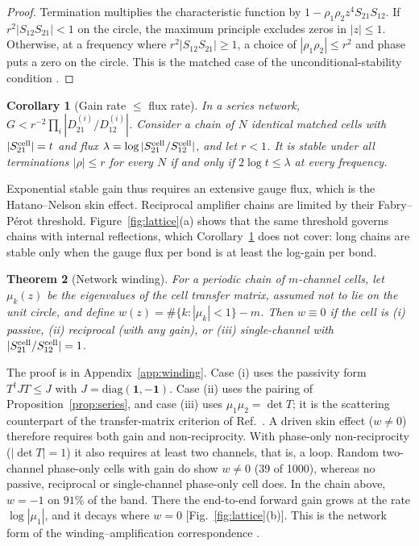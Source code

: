 \documentclass[aps,pra,twocolumn,superscriptaddress,floatfix,nofootinbib]{revtex4-2}
\newtheorem{theorem}{Theorem}
\newtheorem{corollary}[theorem]{Corollary}
\theoremstyle{definition}
\newcommand{\one}{\mathbf 1}
\begin{document}
\begin{proof}
Termination multiplies the characteristic function by $1-\rho_1\rho_2z^4S_{21}S_{12}$. If $r^2|S_{12}S_{21}|<1$ on the circle, the maximum principle excludes zeros in $|z|\le1$. Otherwise, at a frequency where $r^2|S_{12}S_{21}|\ge1$, a choice of $|\rho_1\rho_2|\le r^2$ and phase puts a zero on the circle. This is the matched case of the unconditional-stability condition \cite{Rol62}.
\end{proof}

\begin{corollary}[Gain rate $\le$ flux rate]\label{cor:rate}
In a series network, $G<r^{-2}\prod_i|D^{(i)}_{21}/D^{(i)}_{12}|$. Consider a chain of $N$ identical matched cells with $|S^{\rm cell}_{21}|=t$ and flux $\lambda=\log|S^{\rm cell}_{21}/S^{\rm cell}_{12}|$, and let $r<1$. It is stable under all terminations $|\rho|\le r$ for every $N$ if and only if $2\log t\le\lambda$ at every frequency.
\end{corollary}

Exponential stable gain thus requires an extensive gauge flux, which is the Hatano--Nelson skin effect. Reciprocal amplifier chains are limited by their Fabry--P\'erot threshold. Figure~\ref{fig:lattice}(a) shows that the same threshold governs chains with internal reflections, which Corollary~\ref{cor:rate} does not cover: long chains are stable only when the gauge flux per bond is at least the log-gain per bond.

\begin{theorem}[Network winding]\label{thm:winding}
For a periodic chain of $m$-channel cells, let $\mu_k(z)$ be the eigenvalues of the cell transfer matrix, assumed not to lie on the unit circle, and define $w(z)=\#\{k:|\mu_k|<1\}-m$. Then $w\equiv0$ if the cell is (i) passive, (ii) reciprocal (with any gain), or (iii) single-channel with $|S^{\rm cell}_{21}/S^{\rm cell}_{12}|=1$.
\end{theorem}

The proof is in Appendix~\ref{app:winding}. Case (i) uses the passivity form $T^\dagger JT\le J$ with $J=\mathrm{diag}(\one,-\one)$. Case (ii) uses the pairing of Proposition~\ref{prop:series}, and case (iii) uses $\mu_1\mu_2=\det T$; it is the scattering counterpart of the transfer-matrix criterion of Ref.~\cite{KD19}. A driven skin effect ($w\ne0$) therefore requires both gain and non-reciprocity. With phase-only non-reciprocity ($|\det T|=1$) it also requires at least two channels, that is, a loop. Random two-channel phase-only cells with gain do show $w\neq0$ (39 of 1000), whereas no passive, reciprocal or single-channel phase-only cell does. In the chain above, $w=-1$ on $91\%$ of the band. There the end-to-end forward gain grows at the rate $\log|\mu_1|$, and it decays where $w=0$ [Fig.~\ref{fig:lattice}(b)]. This is the network form of the winding--amplification correspondence \cite{Por19,WBN20,ZRR21,BWN23}.
\end{document}

